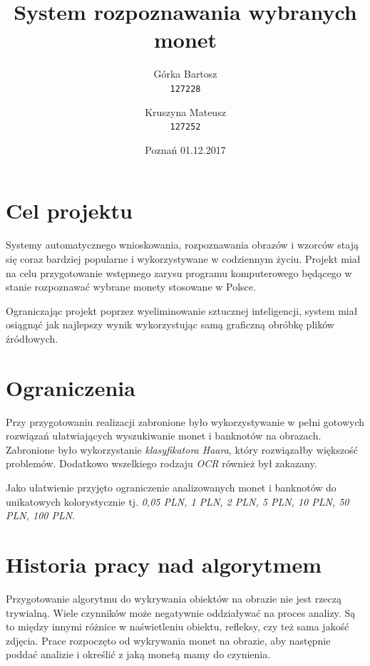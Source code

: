 \documentclass{mwart}
\title{System rozpoznawania wybranych monet}
\author{
    Górka Bartosz\\
  \texttt{127228}
  \and
  Kruszyna Mateusz\\
  \texttt{127252}
}
\date{Poznań 01.12.2017}
\begin{document}
\maketitle

\newpage

\tableofcontents

\newpage

\section{Cel projektu}
Systemy automatycznego wnioskowania, rozpoznawania obrazów i wzorców stają się coraz bardziej popularne i wykorzystywane w codziennym życiu. Projekt miał na celu przygotowanie wstępnego zarysu programu komputerowego będącego w stanie rozpoznawać wybrane monety stosowane w Polsce.

Ograniczając projekt poprzez wyeliminowanie sztucznej inteligencji, system miał osiągnąć jak najlepszy wynik wykorzystując samą graficzną obróbkę plików źródłowych.

\section{Ograniczenia}
Przy przygotowaniu realizacji zabronione było wykorzystywanie w pełni gotowych rozwiązań ułatwiających wyszukiwanie monet i banknotów na obrazach. Zabronione było wykorzystanie \textit{klasyfikatora Haara}, który rozwiązałby większość problemów. Dodatkowo wszelkiego rodzaju \textit{OCR} również był zakazany.

Jako ułatwienie przyjęto ograniczenie analizowanych monet i banknotów do unikatowych kolorystycznie tj. \textit{0,05 PLN, 1 PLN, 2 PLN, 5 PLN, 10 PLN, 50 PLN, 100 PLN}.

\section{Historia pracy nad algorytmem}
Przygotowanie algorytmu do wykrywania obiektów na obrazie nie jest rzeczą trywialną. Wiele czynników może negatywnie oddziaływać na proces analizy. Są to między innymi różnice w naświetleniu obiektu, refleksy, czy też sama jakość zdjęcia.
Prace rozpoczęto od wykrywania monet na obrazie, aby następnie poddać analizie i określić z jaką monetą mamy do czynienia.
\end{document}
